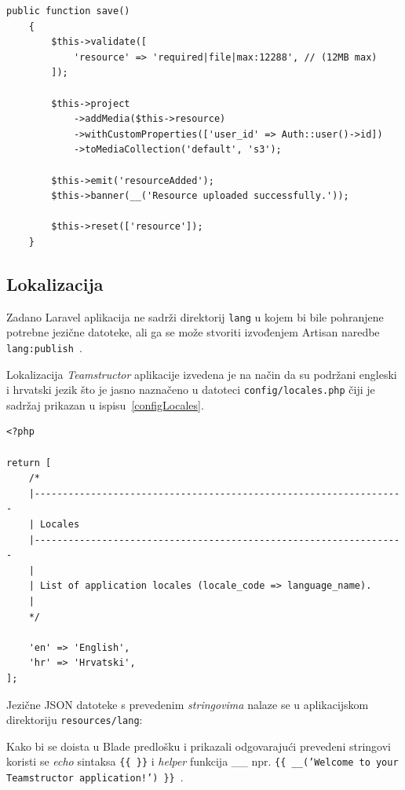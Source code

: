 \begin{lstlisting}[caption={Asociranje resursa s pripadajućim projektom i njegovo pohranjivanje koristeći Media Library metode}, label=uploadResource]
    public function save()
    {
        $this->validate([
            'resource' => 'required|file|max:12288', // (12MB max)
        ]);

        $this->project
            ->addMedia($this->resource)
            ->withCustomProperties(['user_id' => Auth::user()->id])
            ->toMediaCollection('default', 's3');

        $this->emit('resourceAdded');
        $this->banner(__('Resource uploaded successfully.'));

        $this->reset(['resource']);
    }
\end{lstlisting}

\subsection{Lokalizacija}
\label{subsection:localization}
Zadano Laravel aplikacija ne sadrži direktorij \texttt{lang} u kojem bi bile pohranjene potrebne jezične datoteke, ali ga se može stvoriti izvođenjem Artisan naredbe \\ \texttt{lang:publish}~\cite{localization}. 

Lokalizacija \textit{Teamstructor} aplikacije izvedena je na način da su podržani engleski i hrvatski jezik što je jasno naznačeno u datoteci \texttt{config/locales.php} čiji je sadržaj prikazan u ispisu~\ref{configLocales}.

\begin{lstlisting}[caption={Sadržaj datoteke \texttt{config/locales.php}}, label=configLocales]
<?php

return [
    /*
    |------------------------------------------------------------------
    | Locales
    |------------------------------------------------------------------
    |
    | List of application locales (locale_code => language_name).
    |
    */

    'en' => 'English',
    'hr' => 'Hrvatski',
];

\end{lstlisting}

Jezične JSON datoteke s prevedenim \textit{stringovima}  nalaze se u aplikacijskom direktoriju \texttt{resources/lang}:
\\

Kako bi se doista u Blade predlošku i prikazali odgovarajući prevedeni stringovi koristi se \textit{echo} sintaksa \texttt{\{\{ \}\}} i \textit{helper} funkcija \_\_ npr. \texttt{\{\{ \_\_('Welcome to your Teamstructor application!') \}\}}~\cite{localization}.

